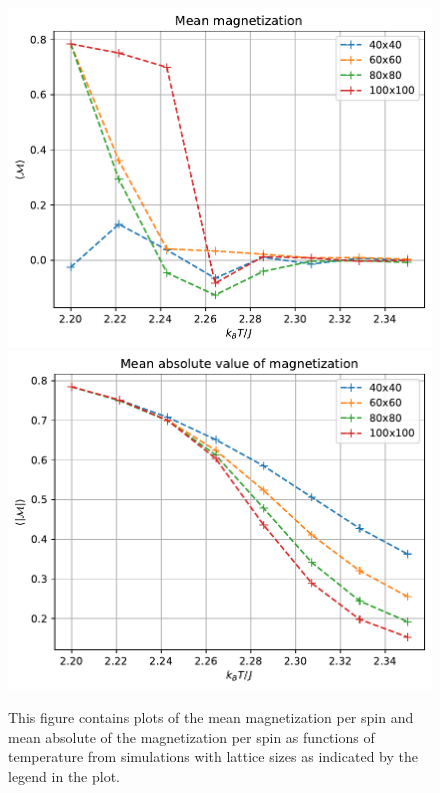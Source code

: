 \documentclass[reprint,english,notitlepage]{revtex4-1}  %
\begin{document}
\begin{figure}[H]
\centering
\includegraphics[width=\columnwidth]{../data/phase-transition-M.pdf}
\includegraphics[width=\columnwidth]{../data/phase-transition-|M|.pdf}
\caption{This figure contains plots of the mean magnetization per spin and mean absolute of the magnetization per spin as functions of temperature from simulations with lattice sizes as indicated by the legend in the plot.} \label{fig:ph-magnetization}
\end{figure}
\end{document}

